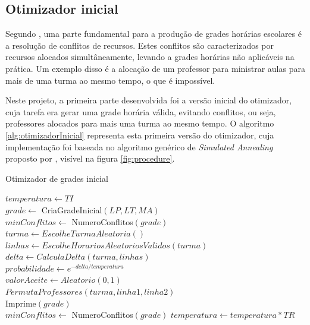 \subsection{Otimizador inicial}

Segundo , uma parte fundamental para a produção de grades horárias escolares é a resolução de conflitos de recursos. Estes conflitos são caracterizados por recursos alocados simultâneamente, levando a grades horárias não aplicáveis na prática. Um exemplo disso é a alocação de um professor para ministrar aulas para mais de uma turma ao mesmo tempo, o que é impossível.

Neste projeto, a primeira parte desenvolvida foi a versão inicial do otimizador, cuja tarefa era gerar uma grade horária válida, evitando conflitos, ou seja, professores alocados para mais uma turma ao mesmo tempo. O algoritmo \ref{alg:otimizadorInicial} representa esta primeira versão do otimizador, cuja implementação foi baseada no algoritmo genérico de \textit{Simulated Annealing} proposto por , visível na figura \ref{fig:procedure}.

\begin{algorithm}
	\caption{Otimizador de grades inicial}
	\label{alg:otimizadorInicial}
	$temperatura \leftarrow TI$\\
	$grade \leftarrow$ CriaGradeInicial$(LP, LT, MA)$\\
	$minConflitos \leftarrow$ NumeroConflitos$(grade)$\\
	 {
		 {
			$turma \leftarrow EscolheTurmaAleatoria()$\\
			$linhas \leftarrow EscolheHorariosAleatoriosValidos(turma)$\\
			$delta \leftarrow CalculaDelta(turma, linhas)$\\
			$probabilidade \leftarrow e^{-delta/temperatura}$\\
			$valorAceite \leftarrow Aleatorio(0, 1)$\\
			 {
				$PermutaProfessores(turma, linha1, linha2)$\\
				 {
					Imprime$(grade)$\\
					$minConflitos \leftarrow$ NumeroConflitos$(grade)$
				}
			}
		}
		$temperatura \leftarrow temperatura * TR$
	}
\end{algorithm}

